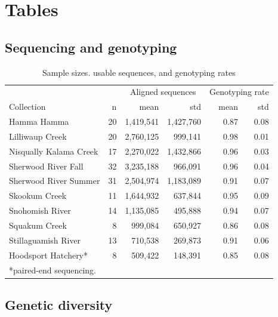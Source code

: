 \documentclass[12pt, one column]{article}
\begin{document}
\section*{Tables}

\subsection*{Sequencing and genotyping}

\begin{table}[H]
\caption{\label{tab:table-name}Sample sizes. usable sequences, and genotyping rates}

\begin{tabular}{lrrrrr}
\toprule
{} & {} & \multicolumn{2}{c}{Aligned sequences} & \multicolumn{2}{c}{Genotyping rate}\\
Collection &  n   &            mean &        std &              mean &       std \\
\midrule
Hamma Hamma            &  20 &         1,419,541 & 1,427,760 &            0.87 &       0.08 \\
Lilliwaup Creek        &  20 &         2,760,125 &   999,141 &            0.98 &       0.01 \\
Nisqually Kalama Creek &  17 &         2,270,022 & 1,432,866 &            0.96 &       0.03 \\
Sherwood River Fall    &  32 &         3,235,188 &   966,091 &            0.96 &       0.04 \\
Sherwood River Summer  &  31 &         2,504,974 & 1,183,089 &            0.91 &       0.07 \\
Skookum Creek          &  11 &         1,644,932 &   637,844 &            0.95 &       0.09 \\
Snohomish River        &  14 &         1,135,085 &   495,888 &            0.94 &       0.07 \\
Squakum Creek          &   8 &           999,084 &   650,927 &            0.86 &       0.08 \\
Stillaguamish River    &  13 &           710,538 &   269,873 &            0.91 &       0.06 \\
\midrule
Hoodsport Hatchery*    &   8 &           509,422 &   148,391 &            0.85 &       0.08 \\
\bottomrule
\multicolumn{6}{l}{*paired-end sequencing.}
5\end{tabular}

\end {table}

\subsection*{Genetic diversity} 
\end{document}
